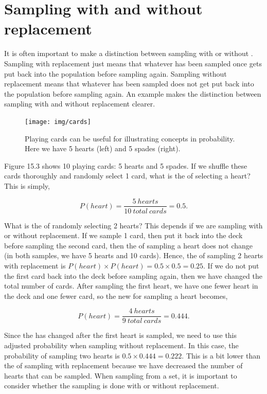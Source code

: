 \documentclass[
  openany]{krantz}
\begin{document}
\hypertarget{sampling-with-and-without-replacement}{%
\section{Sampling with and without replacement}\label{sampling-with-and-without-replacement}}

It is often important to make a distinction between sampling with or without .
Sampling with replacement just means that whatever has been sampled once gets put back into the population before sampling again.
Sampling without replacement means that whatever has been sampled does not get put back into the population before sampling again.
An example makes the distinction between sampling with and without replacement clearer.

\begin{figure}
\texttt{[image: img/cards]} \caption{Playing cards can be useful for illustrating concepts in probability. Here we have 5 hearts (left) and 5 spades (right).}\label{fig:unnamed-chunk-52}
\end{figure}

Figure 15.3 shows 10 playing cards: 5 hearts and 5 spades.
If we shuffle these cards thoroughly and randomly select 1 card, what is the  of selecting a heart?
This is simply,

\[P(heart) = \frac{5\:hearts}{10\:total\:cards} = 0.5.\]

What is the  of randomly selecting 2 hearts?
This depends if we are sampling with or without replacement.
If we sample 1 card, then put it back into the deck before sampling the second card, then the  of sampling a heart does not change (in both samples, we have 5 hearts and 10 cards).
Hence, the  of sampling 2 hearts with replacement is \(P(heart) \times P(heart) = 0.5 \times 0.5 = 0.25\).
If we do not put the first card back into the deck before sampling again, then we have changed the total number of cards.
After sampling the first heart, we have one fewer heart in the deck and one fewer card, so the new  for sampling a heart becomes,

\[P(heart) = \frac{4\:hearts}{9\:total\:cards} = 0.444.\]

Since the  has changed after the first heart is sampled, we need to use this adjusted probability when sampling without replacement.
In this case, the probability of sampling two hearts is \(0.5 \times 0.444 = 0.222\).
This is a bit lower than the  of sampling with replacement because we have decreased the number of hearts that can be sampled.
When sampling from a set, it is important to consider whether the sampling is done with or without replacement.
\end{document}
